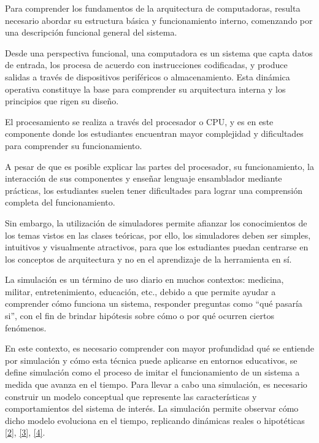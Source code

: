 \documentclass[12pt,oneside]{templates/unerthesis}
\begin{document}
Para comprender los fundamentos de la arquitectura de computadoras, resulta necesario abordar su estructura básica y funcionamiento interno, comenzando por una descripción funcional general del sistema.

Desde una perspectiva funcional, una computadora es un sistema que capta datos de entrada, los procesa de acuerdo con instrucciones codificadas, y produce salidas a través de dispositivos periféricos o almacenamiento. Esta dinámica operativa constituye la base para comprender su arquitectura interna y los principios que rigen su diseño.

El procesamiento se realiza a través del procesador o CPU, y es en este componente donde los estudiantes encuentran mayor complejidad y dificultades para comprender su funcionamiento.

A pesar de que es posible explicar las partes del procesador, su funcionamiento, la interacción de sus componentes y enseñar lenguaje ensamblador mediante prácticas, los estudiantes suelen tener dificultades para lograr una comprensión completa del funcionamiento.

Sin embargo, la utilización de simuladores permite afianzar los conocimientos de los temas vistos en las clases teóricas, por ello, los simuladores deben ser simples, intuitivos y visualmente atractivos, para que los estudiantes puedan centrarse en los conceptos de arquitectura y no en el aprendizaje de la herramienta en sí.

La simulación es un término de uso diario en muchos contextos: medicina, militar, entretenimiento, educación, etc., debido a que permite ayudar a comprender cómo funciona un sistema, responder preguntas como ``qué pasaría si'', con el fin de brindar hipótesis sobre cómo o por qué ocurren ciertos fenómenos.

En este contexto, es necesario comprender con mayor profundidad qué se entiende por simulación y cómo esta técnica puede aplicarse en entornos educativos, se define simulación como el proceso de imitar el funcionamiento de un sistema a medida que avanza en el tiempo. Para llevar a cabo una simulación, es necesario construir un modelo conceptual que represente las características y comportamientos del sistema de interés. La simulación permite observar cómo dicho modelo evoluciona en el tiempo, replicando dinámicas reales o hipotéticas \protect\hyperlink{ref-banks_discrete-event_2010}{{[}2{]}}, \protect\hyperlink{ref-law_simulation_2015}{{[}3{]}}, \protect\hyperlink{ref-robinson_simulation_2014}{{[}4{]}}.
\end{document}
